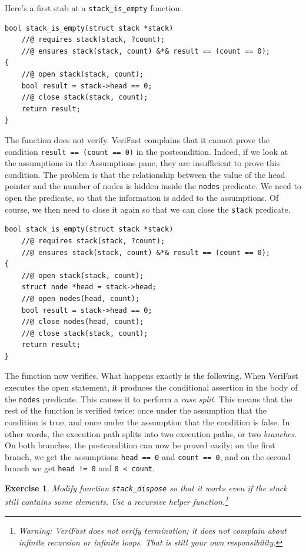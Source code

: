 \documentclass{article}
\newtheorem{exercise}{Exercise}
\begin{document}
Here's a first stab at a \lstinline!stack_is_empty! function:
\begin{lstlisting}
bool stack_is_empty(struct stack *stack)
    //@ requires stack(stack, ?count);
    //@ ensures stack(stack, count) &*& result == (count == 0);
{
    //@ open stack(stack, count);
    bool result = stack->head == 0;
    //@ close stack(stack, count);
    return result;
}
\end{lstlisting}
The function does not verify. VeriFast complains that it cannot
prove the condition \lstinline!result == (count == 0)! in the
postcondition. Indeed, if we look at the assumptions in the
Assumptions pane, they are insufficient to prove this
condition. The problem is that the relationship between the
value of the head pointer and the number of nodes is hidden
inside the \lstinline!nodes! predicate. We need to open the
predicate, so that the information is added to the assumptions.
Of course, we then need to close it again so that we can close
the \lstinline!stack! predicate.
\begin{lstlisting}
bool stack_is_empty(struct stack *stack)
    //@ requires stack(stack, ?count);
    //@ ensures stack(stack, count) &*& result == (count == 0);
{
    //@ open stack(stack, count);
    struct node *head = stack->head;
    //@ open nodes(head, count);
    bool result = stack->head == 0;
    //@ close nodes(head, count);
    //@ close stack(stack, count);
    return result;
}
\end{lstlisting}
The function now verifies. What happens exactly is the
following. When VeriFast executes the open statement, it
produces the conditional assertion in the body of the
\lstinline!nodes! predicate. This causes it to perform a
\emph{case split}. This means that the rest of the function is
verified twice: once under the assumption that the condition is
true, and once under the assumption that the condition is
false. In other words, the execution path splits into two
execution paths, or two \emph{branches}. On both branches, the
postcondition can now be proved easily: on the first branch, we
get the assumptions \lstinline!head == 0! and %
\lstinline!count == 0!, and on the second branch we get
\lstinline$head != 0$ and \lstinline$0 < count$.

\begin{exercise}\label{exercise:stack2}
Modify function \lstinline!stack_dispose! so that it works even
if the stack still contains some elements. Use a recursive
helper function.\footnote{Warning: VeriFast does not verify
termination; it does not complain about infinite recursion or
infinite loops. That is still your own responsibility.}
\end{exercise}
\end{document}
